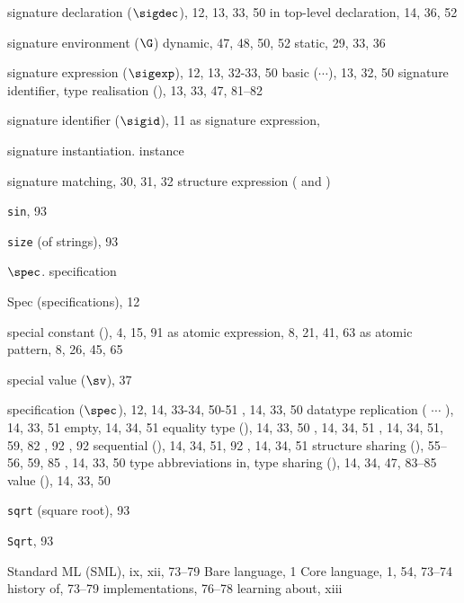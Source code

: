 \begin{theindex}
\item signature declaration ($\sigdec$), 12, 13, 33, 50
\subitem in top-level declaration, 14, 36, 52
\item signature environment ($\G$)
\subitem dynamic, 47, 48, 50, 52
\subitem static, 29, 33, 36
\item signature expression ($\sigexp$), 12, 13, 32-33, 50
\subitem basic ($\cdots$), 13, 32, 50
\subitem signature identifier, \sigidrefs
\subitem type realisation (), 13, 33, 47, 81--82
\item signature identifier ($\sigid$), 11
\subitem as signature expression, \sigidrefs
\item signature instantiation. \see instance
\item signature matching, 30, 31, 32
\subitem \seealso structure expression (\boxml{:} and \boxml{:>})
\item {\tt sin}, 93
\item {\tt size} (of strings), 93
\item $\spec$. \see specification
\item Spec (specifications), 12
\item special constant (\scon), 4, 15, 91
\subitem as atomic expression, 8, 21, 41, 63
\subitem as atomic pattern, 8, 26, 45, 65
\item special value ($\sv$), 37
\item specification ($\spec$), 12, 14, 33-34, 50-51
\subitem {}, 14, 33, 50
\subitem datatype replication ( $\cdots$ \linebreak
{}), 14, 33, 51
\subitem empty, 14, 34, 51
\subitem equality type (), 14, 33, 50
\subitem {}, 14, 34, 51
\subitem {}, 14, 34, 51, 59, 82
\subitem {}, 92
\subitem {}, 92
\subitem sequential (\boxml{;}), 14, 34, 51, 92
\subitem {}, 14, 34, 51
\subitem structure sharing (), 55--56, 59, 85
\subitem {}, 14, 33, 50
\subitem type abbreviations in, \typabbrinsigsrefs
\subitem type sharing (), 14, 34, 47, 83--85
\subitem value (), 14, 33, 50
\item {\tt sqrt} (square root), 93
\item {\tt Sqrt}, 93
\item Standard ML (SML), ix, xii, 73--79
\subitem Bare language, 1
\subitem Core language, 1, 54, 73--74
\subitem history of, 73--79
\subitem implementations, 76--78
\subitem learning about, xiii

\end{theindex}
